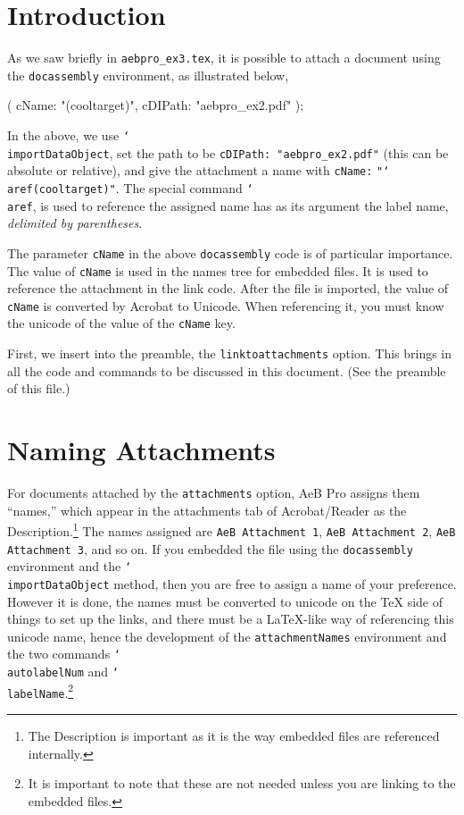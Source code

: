 \documentclass{article}
\newcommand{\cs}[1]{\texttt{\char`\\#1}}
\def\aftersverbskip{\noindent}
\newenvironment{sverbatim}
{\par\small\verbatim}
{\endverbatim\par\aftergroup\aftersverbskip}
\begin{document}
\maketitle

\tableofcontents

\section{Introduction}

As we saw briefly in \texttt{aebpro\_ex3.tex}, it is possible to
attach a document using the \texttt{docassembly} environment, as
illustrated below,
\begin{sverbatim}
    \begin{docassembly}
    \importDataObject({
        cName: "\aref(cooltarget)",
        cDIPath: "aebpro_ex2.pdf"
    });
    \end{docassembly}
\end{sverbatim}
In the above, we use \cs{importDataObject}, set the path to be
\texttt{cDIPath: "aebpro\_ex2.pdf"} (this can be absolute or
relative), and give the attachment a name with \texttt{cName:}
\texttt{"\cs{aref(cooltarget)}"}. The special command \cs{aref}, is
used to reference the assigned name has as its argument the label
name, \emph{delimited by parentheses}.

The parameter \texttt{cName} in the above \texttt{docassembly} code
is of particular importance. The value of \texttt{cName} is used in
the names tree for embedded files. It is used to reference the
attachment in the link code.  After the file is imported, the value
of \texttt{cName} is converted by Acrobat to Unicode. When
referencing it, you must know the unicode of the value of the
\texttt{cName} key.

First, we insert into the preamble, the \texttt{linktoattachments} option.
This brings in all the code and commands to be discussed in this document.
(See the preamble of this file.)

\section{Naming Attachments}

For documents attached by the \texttt{attachments} option, AeB Pro
assigns them ``names,'' which appear in the attachments tab of
Acrobat/Reader as the Description.\footnote{The Description is
important as it is the way embedded files are referenced
internally.} The names assigned are \texttt{AeB Attachment 1},
\texttt{AeB Attachment 2}, \texttt{AeB Attachment 3}, and so on.
If you embedded the file using the \texttt{docassem\-bly} environment
and the \cs{importDataObject} method, then you are free to assign a
name of your preference. However it is done, the names must be
converted to unicode on the {\TeX} side of things to set up the
links, and there must be a \LaTeX-like way of referencing this
unicode name, hence the development of the \texttt{attachmentNames}
environment and the two commands \cs{autolabelNum} and
\cs{labelName}.\footnote{It is important to note that
these are not needed unless you are linking to the embedded
files.}
\end{document}
